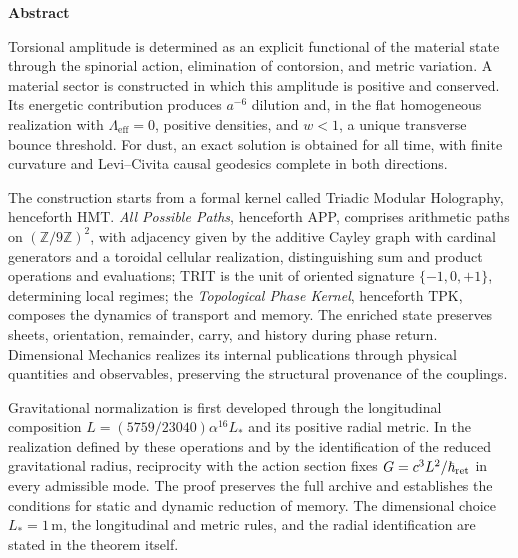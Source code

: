 
\begin{center}\bfseries Abstract\end{center}
\begingroup
\fontsize{10.5}{12}\selectfont
\setlength{\parskip}{2pt plus 1pt minus .5pt}
\noindent
Torsional amplitude is determined as an explicit functional of the
material state through the spinorial action, elimination of contorsion,
and metric variation. A material sector is constructed in which this
amplitude is positive and conserved. Its energetic contribution produces
\(a^{-6}\) dilution and, in the flat homogeneous realization with
\(\Lambda_{\mathrm{eff}}=0\), positive densities, and \(w<1\), a unique
transverse bounce threshold. For dust, an exact solution is obtained for
all time, with finite curvature and Levi--Civita causal geodesics complete
in both directions.

The construction starts from a formal kernel called Triadic Modular
Holography, henceforth HMT. \emph{All Possible Paths}, henceforth APP,
comprises arithmetic paths on \((\mathbb Z/9\mathbb Z)^2\), with
adjacency given by the additive Cayley graph with cardinal generators
and a toroidal cellular realization, distinguishing sum and product
operations and evaluations; TRIT is the unit
of oriented signature \(\{-1,0,+1\}\), determining local regimes; the
\emph{Topological Phase Kernel}, henceforth TPK, composes the dynamics of
transport and memory. The enriched state preserves sheets, orientation,
remainder, carry, and history during phase return. Dimensional Mechanics
realizes its internal publications through physical quantities and
observables, preserving the structural provenance of the couplings.

Gravitational normalization is first developed through the longitudinal
composition \(L=(5759/23040)\alpha^{16}L_*\) and its positive radial
metric. In the realization defined by these operations and by the
identification of the reduced gravitational radius, reciprocity with the
action section fixes \(G=c^3L^2/\hbar_{\rm ret}\) in every admissible
mode. The proof preserves the full archive and establishes the conditions
for static and dynamic reduction of memory. The dimensional choice
\(L_*=1\,\mathrm m\), the longitudinal and metric rules, and the
radial identification are stated in the theorem itself.

